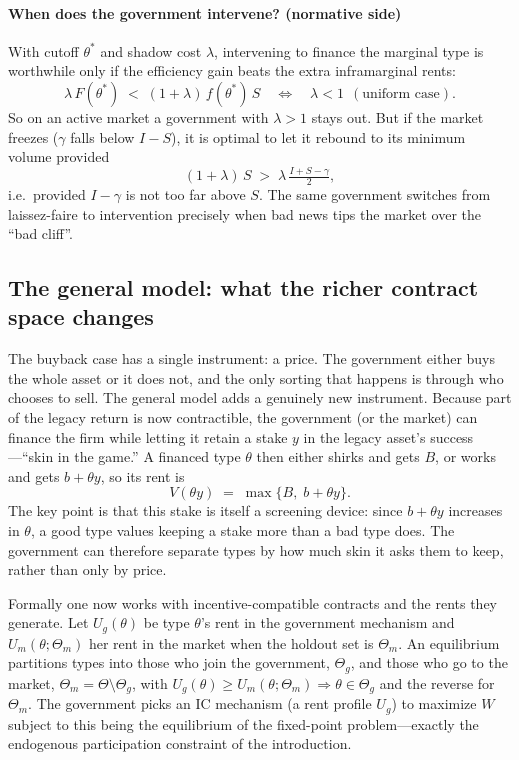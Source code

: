 \documentclass[11pt]{article}
\theoremstyle{definition}
\theoremstyle{plain}
\newcommand{\Ug}{U_g}
\newcommand{\Um}{U_m}
\begin{document}
\paragraph{When does the government intervene? (normative side)} With cutoff $\theta^\ast$ and
shadow cost $\lambda$, intervening to finance the marginal type is worthwhile
only if the efficiency gain beats the extra inframarginal rents:
\[
\lambda\,F(\theta^\ast) \;<\; (1+\lambda)\,f(\theta^\ast)\,S
\quad\Longleftrightarrow\quad \lambda<1 \ \ (\text{uniform case}).
\]
So on an active market a government with $\lambda>1$ stays out. But if the
market freezes ($\gamma$ falls below $I-S$), it is optimal to let it
rebound to its minimum volume provided
\[
(1+\lambda)\,S \;>\; \lambda\,\tfrac{I+S-\gamma}{2},
\]
i.e.\ provided $I-\gamma$ is not too far above $S$. The same government switches
from laissez-faire to intervention precisely when bad news tips the
market over the ``bad cliff''.
\subsection{The general model: what the richer contract space changes}

The buyback case has a single instrument: a price. The government either buys
the whole asset or it does not, and the only sorting that happens is through who
chooses to sell. The general model adds a genuinely new instrument. Because part
of the legacy return is now contractible, the government (or the market) can
finance the firm while letting it retain a stake $y$ in the legacy
asset's success---``skin in the game.'' A financed type $\theta$ then either
shirks and gets $B$, or works and gets $b+\theta y$, so its rent is
\[
V(\theta y) \;=\; \max\{B,\; b+\theta y\}.
\]
The key point is that this stake is itself a screening device: since
$b+\theta y$ increases in $\theta$, a good type values keeping a stake more than
a bad type does. The government can therefore separate types by how much skin it
asks them to keep, rather than only by price.

Formally one now works with incentive-compatible contracts and the rents they
generate. Let $\Ug(\theta)$ be type $\theta$'s rent in the government mechanism
and $\Um(\theta;\Theta_m)$ her rent in the market when the holdout set is
$\Theta_m$. An equilibrium partitions types into those who join the government,
$\Theta_g$, and those who go to the market, $\Theta_m=\Theta\setminus\Theta_g$,
with $\Ug(\theta)\ge\Um(\theta;\Theta_m)\Rightarrow\theta\in\Theta_g$ and the
reverse for $\Theta_m$. The government picks an IC mechanism (a rent profile
$\Ug$) to maximize $W$ subject to this being the equilibrium of the fixed-point
problem---exactly the endogenous participation constraint of the introduction.
\end{document}
